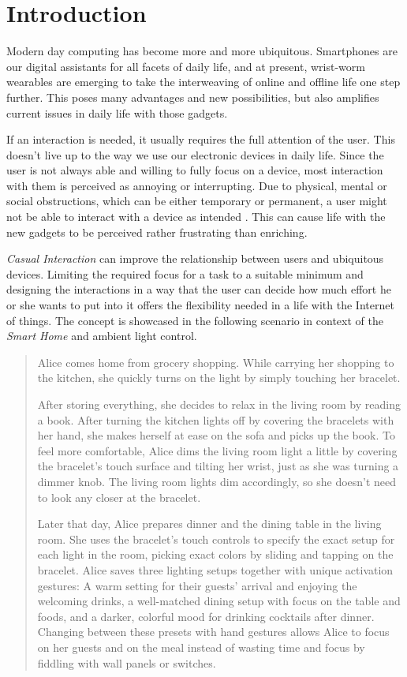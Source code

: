 \chapter{Introduction}

Modern day computing has become more and more ubiquitous. Smartphones are our digital assistants for all facets of daily life, and at present, wrist-worm wearables are emerging to take the interweaving of online and offline life one step further. This poses many advantages and new possibilities, but also amplifies current issues in daily life with those gadgets.

If an interaction is needed, it usually requires the full attention of the user. This doesn't live up to the way we use our electronic devices in daily life. Since the user is not always able and willing to fully focus on a device, most interaction with them is perceived as annoying or interrupting. Due to physical, mental or social obstructions, which can be either temporary or permanent, a user might not be able to interact with a device as intended \cite{Pohl2013}. This can cause life with the new gadgets to be perceived rather frustrating than enriching.

\textit{Casual Interaction} can improve the relationship between users and ubiquitous devices. Limiting the required focus for a task to a suitable minimum and designing the interactions in a way that the user can decide how much effort he or she wants to put into it offers the flexibility needed in a life with the Internet of things. The concept is showcased in the following scenario in context of the \textit{Smart Home} and ambient light control.

\begin{quotation}
	Alice comes home from grocery shopping. While carrying her shopping to the kitchen, she quickly turns on the light by simply touching her bracelet.
	
	After storing everything, she decides to relax in the living room by reading a book. After turning the kitchen lights off by covering the bracelets with her hand, she makes herself at ease on the sofa and picks up the book. To feel more comfortable, Alice dims the living room light a little by covering the bracelet's touch surface and tilting her wrist, just as she was turning a dimmer knob. The living room lights dim accordingly, so she doesn't need to look any closer at the bracelet.
	
	Later that day, Alice prepares dinner and the dining table in the living room. She uses the bracelet's touch controls to specify the exact setup for each light in the room, picking exact colors by sliding and tapping on the bracelet. Alice saves three lighting setups together with unique activation gestures: A warm setting for their guests' arrival and enjoying the welcoming drinks, a well-matched dining setup with focus on the table and foods, and a darker, colorful mood for drinking cocktails after dinner. Changing between these presets with hand gestures allows Alice to focus on her guests and on the meal instead of wasting time and focus by fiddling with wall panels or switches.
	\end{quotation}
	

